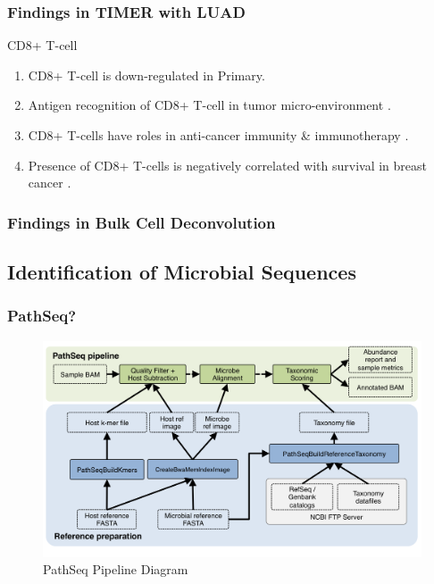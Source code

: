\documentclass{beamer}
\begin{document}
    \begin{frame}[allowframebreaks]
        \frametitle{Findings in TIMER with LUAD}

        \begin{block}{CD8+ T-cell}
            \begin{enumerate}
                \item CD8+ T-cell is down-regulated in Primary.
                \item Antigen recognition of CD8+ T-cell in tumor micro-environment \cite{CD8+Tcell-1}.
                \item CD8+ T-cells have roles in anti-cancer immunity \& immunotherapy \cite{CD8+Tcell-2}.
                \item Presence of CD8+ T-cells is negatively correlated with survival in breast cancer \cite{CD8+Tcell-3}.
            \end{enumerate}
        \end{block}
    \end{frame}

    \begin{frame}
        \frametitle{Findings in Bulk Cell Deconvolution}
    \end{frame}

    \subsection{Identification of Microbial Sequences}
    \begin{frame}
        \frametitle{PathSeq?}

        \begin{figure}
            \includegraphics[width=0.8 \linewidth]{figures/Workflow/PathSeq.png}
            \caption{PathSeq Pipeline Diagram \protect\cite{pathseq1, pathseq2}}
        \end{figure}
    \end{frame}
\end{document}

